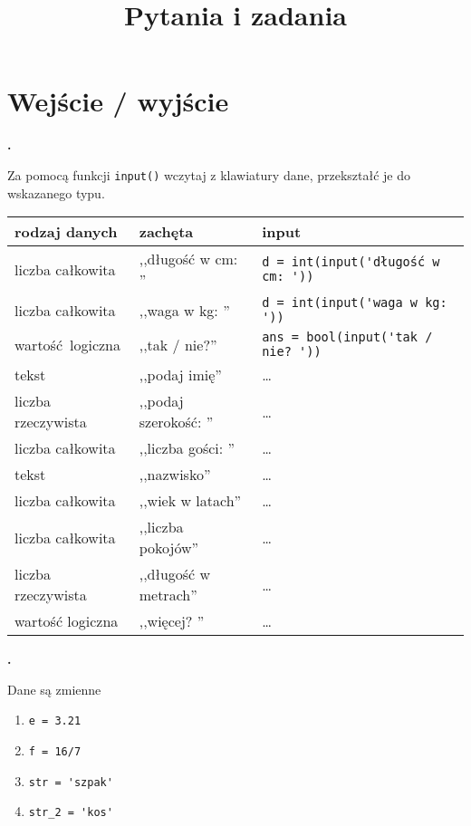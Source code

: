 \documentclass[a4paper]{article}
\title{Pytania i zadania}
\begin{document}
\maketitle
\tableofcontents

\setcounter{zadanie}{1}

\section{Wejście / wyjście}
\textbf{.}\addtocounter{zadanie}{1} Za pomocą funkcji \verb|input()| wczytaj z klawiatury dane, przekształć je do wskazanego typu.

\begin{tabular}{l|l|l}
\textsf{rodzaj danych} & \textsf{zachęta} & \textsf{input} \\\hline
liczba całkowita & ,,długość w cm: '' & \verb|d = int(input('długość w cm: '))|\\\hline
liczba całkowita & ,,waga w kg: '' & \verb|d = int(input('waga w kg: '))|\\\hline
wartość logiczna & ,,tak / nie?'' & \verb|ans = bool(input('tak / nie? '))|\\\hline
tekst & ,,podaj imię'' & \dots \\\hline
liczba rzeczywista & ,,podaj szerokość: '' & \dots \\\hline
liczba całkowita & ,,liczba gości: '' & \dots \\\hline
tekst & ,,nazwisko'' & \dots \\\hline
liczba całkowita & ,,wiek w latach'' & \dots \\\hline
liczba całkowita & ,,liczba pokojów'' & \dots \\\hline
liczba rzeczywista & ,,długość w metrach'' & \dots \\\hline
wartość logiczna & ,,więcej? '' & \dots
\end{tabular}

\textbf{.}\addtocounter{zadanie}{1} Dane są zmienne
\begin{enumerate}[]
    \item \verb|e = 3.21|
    \item \verb|f = 16/7|
    \item \verb|str = 'szpak'|
    \item \verb|str_2 = 'kos'|
\end{enumerate}
\end{document}
